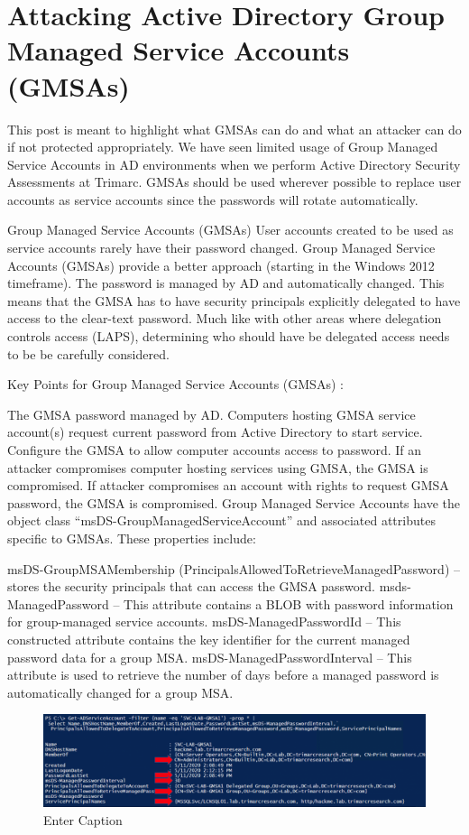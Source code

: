 \chapter{Attacking Active Directory Group Managed Service Accounts (GMSAs)}

This post is meant to highlight what GMSAs can do and what an attacker can do if not protected appropriately. We have seen limited usage of Group Managed Service Accounts in AD environments when we perform Active Directory Security Assessments at Trimarc. GMSAs should be used wherever possible to replace user accounts as service accounts since the passwords will rotate automatically.

Group Managed Service Accounts (GMSAs)
User accounts created to be used as service accounts rarely have their password changed. Group Managed Service Accounts (GMSAs) provide a better approach (starting in the Windows 2012 timeframe). The password is managed by AD and automatically changed. This means that the GMSA has to have security principals explicitly delegated to have access to the clear-text password. Much like with other areas where delegation controls access (LAPS), determining who should have be delegated access needs to be be carefully considered.

Key Points for Group Managed Service Accounts (GMSAs) :

The GMSA password managed by AD.
Computers hosting GMSA service account(s) request current password from Active Directory to start service.
Configure the GMSA to allow computer accounts access to password.
If an attacker compromises computer hosting services using GMSA, the GMSA is compromised.
If attacker compromises an account with rights to request GMSA password, the GMSA is compromised.
Group Managed Service Accounts have the object class “msDS-GroupManagedServiceAccount” and associated attributes specific to GMSAs. These properties include:

msDS-GroupMSAMembership (PrincipalsAllowedToRetrieveManagedPassword) – stores the security principals that can access the GMSA password.
msds-ManagedPassword – This attribute contains a BLOB with password information for group-managed service accounts.
msDS-ManagedPasswordId – This constructed attribute contains the key identifier for the current managed password data for a group MSA.
msDS-ManagedPasswordInterval – This attribute is used to retrieve the number of days before a managed password is automatically changed for a group MSA.

\begin{figure}
    \centering
    \includegraphics[width=0.75\linewidth]{msdspass.png}
    \caption{Enter Caption}
    \label{fig:placeholder}
\end{figure}

